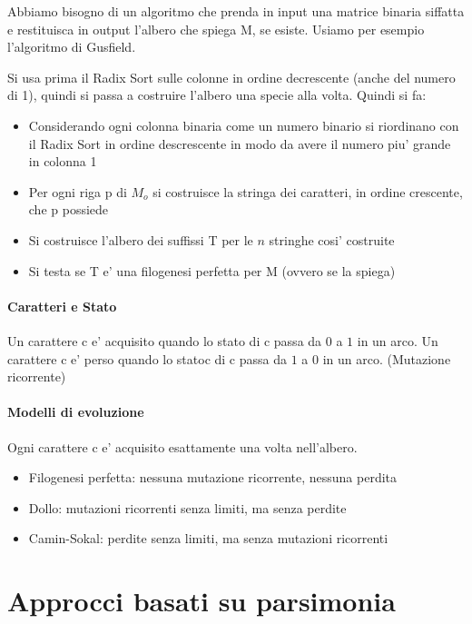 Abbiamo bisogno di un algoritmo che prenda in input una matrice binaria siffatta e restituisca in output l'albero che spiega M, se esiste. Usiamo per esempio l'algoritmo di Gusfield.

Si usa prima il Radix Sort sulle colonne in ordine decrescente (anche del numero di 1), quindi si passa a costruire l'albero una specie alla volta. Quindi si fa:

\begin{itemize}
    \item Considerando ogni colonna binaria come un numero binario si riordinano con il Radix Sort in ordine descrescente in modo da avere il numero piu' grande in colonna 1
    \item Per ogni riga p di $M_o$ si costruisce la stringa dei caratteri, in ordine crescente, che p possiede
    \item Si costruisce l'albero dei suffissi T per le $n$ stringhe cosi' costruite
    \item Si testa se T e' una filogenesi perfetta per M (ovvero se la spiega)
\end{itemize}

\paragraph{Caratteri e Stato}

Un carattere c e' acquisito quando lo stato di c passa da $0$ a $1$ in un arco.
Un carattere c e' perso quando lo statoc di c passa da $1$ a $0$ in un arco. (Mutazione ricorrente)

\paragraph{Modelli di evoluzione}

Ogni carattere c e' acquisito esattamente una volta nell'albero.

\begin{itemize}
    \item Filogenesi perfetta: nessuna mutazione ricorrente, nessuna perdita
    \item Dollo: mutazioni ricorrenti senza limiti, ma senza perdite
    \item Camin-Sokal: perdite senza limiti, ma senza mutazioni ricorrenti
\end{itemize}

\section{Approcci basati su parsimonia}

